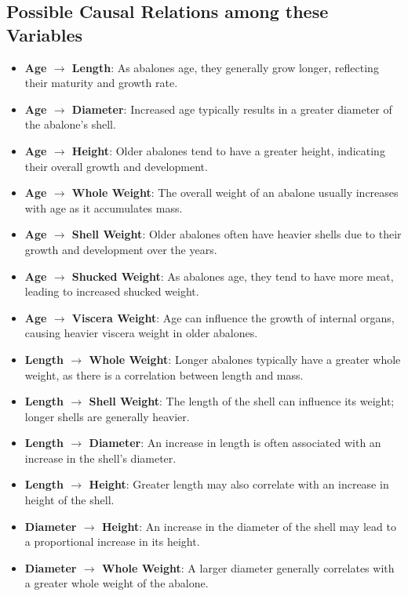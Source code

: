 \documentclass{article}
\begin{document}
\subsection{Possible Causal Relations among these Variables}

\begin{minipage}[t]{0.7\linewidth}
\begin{itemize}
\item \textbf{Age $\rightarrow$ Length}: As abalones age, they generally grow longer, reflecting their maturity and growth rate.
\item \textbf{Age $\rightarrow$ Diameter}: Increased age typically results in a greater diameter of the abalone's shell.
\item \textbf{Age $\rightarrow$ Height}: Older abalones tend to have a greater height, indicating their overall growth and development.
\item \textbf{Age $\rightarrow$ Whole Weight}: The overall weight of an abalone usually increases with age as it accumulates mass.
\item \textbf{Age $\rightarrow$ Shell Weight}: Older abalones often have heavier shells due to their growth and development over the years.
\item \textbf{Age $\rightarrow$ Shucked Weight}: As abalones age, they tend to have more meat, leading to increased shucked weight.
\item \textbf{Age $\rightarrow$ Viscera Weight}: Age can influence the growth of internal organs, causing heavier viscera weight in older abalones.
\item \textbf{Length $\rightarrow$ Whole Weight}: Longer abalones typically have a greater whole weight, as there is a correlation between length and mass.
\item \textbf{Length $\rightarrow$ Shell Weight}: The length of the shell can influence its weight; longer shells are generally heavier.
\item \textbf{Length $\rightarrow$ Diameter}: An increase in length is often associated with an increase in the shell's diameter.
\item \textbf{Length $\rightarrow$ Height}: Greater length may also correlate with an increase in height of the shell.
\item \textbf{Diameter $\rightarrow$ Height}: An increase in the diameter of the shell may lead to a proportional increase in its height.
\item \textbf{Diameter $\rightarrow$ Whole Weight}: A larger diameter generally correlates with a greater whole weight of the abalone.

\end{itemize}
\end{minipage}
\end{document}
